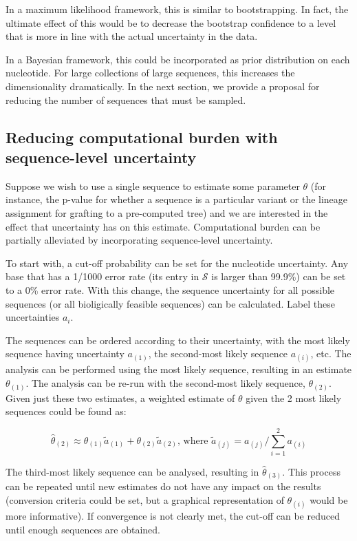 \documentclass[
]{article}
\newcommand{\nps}{\mathcal{S}} %
\begin{document}
In a maximum likelihood framework, this is similar to bootstrapping. In
fact, the ultimate effect of this would be to decrease the bootstrap
confidence to a level that is more in line with the actual uncertainty
in the data.

In a Bayesian framework, this could be incorporated as prior
distribution on each nucleotide. For large collections of large
sequences, this increases the dimensionality dramatically. In the next
section, we provide a proposal for reducing the number of sequences that
must be sampled.

\hypertarget{reducing-computational-burden-with-sequence-level-uncertainty}{%
\subsection{Reducing computational burden with sequence-level
uncertainty}\label{reducing-computational-burden-with-sequence-level-uncertainty}}

Suppose we wish to use a single sequence to estimate some parameter
\(\theta\) (for instance, the p-value for whether a sequence is a
particular variant or the lineage assignment for grafting to a
pre-computed tree) and we are interested in the effect that uncertainty
has on this estimate. Computational burden can be partially alleviated
by incorporating sequence-level uncertainty.

To start with, a cut-off probability can be set for the nucleotide
uncertainty. Any base that has a 1/1000 error rate (its entry in
\(\nps\) is larger than 99.9\%) can be set to a 0\% error rate. With
this change, the sequence uncertainty for all possible sequences (or all
bioligically feasible sequences) can be calculated. Label these
uncertainties \(a_i\).

The sequences can be ordered according to their uncertainty, with the
most likely sequence having uncertainty \(a_{(1)}\), the second-most
likely sequence \(a_{(i)}\), etc. The analysis can be performed using
the most likely sequence, resulting in an estimate \(\theta_{(1)}\). The
analysis can be re-run with the second-most likely sequence,
\(\theta_{(2)}\). Given just these two estimates, a weighted estimate of
\(\theta\) given the 2 most likely sequences could be found as:

\[
\hat\theta_{(2)} \approx \theta_{(1)} \tilde a_{(1)} + \theta_{(2)}\tilde a_{(2)}\text{, where }\tilde a_{(j)}=a_{(j)}/\sum_{i=1}^2a_{(i)}
\]

The third-most likely sequence can be analysed, resulting in
\(\hat\theta_{(3)}\). This process can be repeated until new estimates
do not have any impact on the results (conversion criteria could be set,
but a graphical representation of \(\theta_{(i)}\) would be more
informative). If convergence is not clearly met, the cut-off can be
reduced until enough sequences are obtained.
\end{document}
